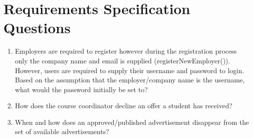 \documentclass[11pt]{l3deliverable}
\begin{document}
\newpage



\newpage

\section{Requirements Specification Questions}

\begin{enumerate}

\item{Employers are required to register however during the registration process
only the company name and email is supplied (registerNewEmployer()). However,
users are required to supply their username and password to login. Based on the
assumption that the employer/company name is the username, what would the
password initially be set to?}

\item{How does the course coordinator decline an offer a student has received?}

\item{\label{itm:advertDestroy} When and how does an approved/published 
advertisement disappear from the set of available advertisements?}

\end{enumerate}
\end{document}
